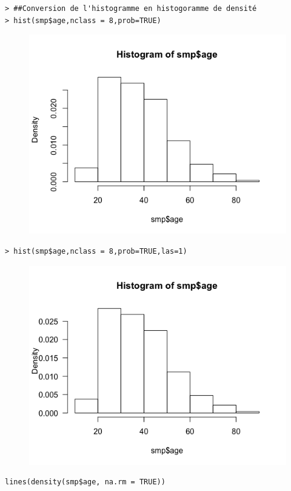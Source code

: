 \begin{lstlisting}[language=html]
> ##Conversion de l'histogramme en histogoramme de densité
> hist(smp$age,nclass = 8,prob=TRUE)
\end{lstlisting}

\begin{figure}[H]\begin{center}\includegraphics[scale=0.45]{ilu/lab2-6.png}\end{center}\end{figure}

\begin{lstlisting}[language=html]
> hist(smp$age,nclass = 8,prob=TRUE,las=1)
\end{lstlisting}

\begin{figure}[H]\begin{center}\includegraphics[scale=0.45]{ilu/lab2-7.png}\end{center}\end{figure}
\begin{lstlisting}[language=html]
lines(density(smp$age, na.rm = TRUE))
\end{lstlisting}

